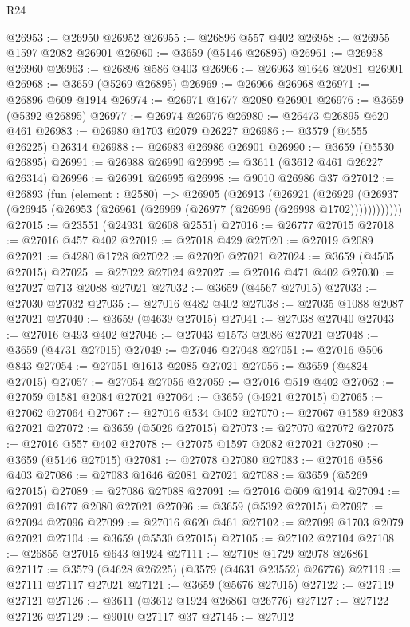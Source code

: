 \begin{lexlean}{R24}
\begin{coremodule}
@26953 := @26950 @26952
@26955 := @26896 @557 @402
@26958 := @26955 @1597 @2082 @26901
@26960 := @3659 (@5146 @26895)
@26961 := @26958 @26960
@26963 := @26896 @586 @403
@26966 := @26963 @1646 @2081 @26901
@26968 := @3659 (@5269 @26895)
@26969 := @26966 @26968
@26971 := @26896 @609 @1914
@26974 := @26971 @1677 @2080 @26901
@26976 := @3659 (@5392 @26895)
@26977 := @26974 @26976
@26980 := @26473 @26895 @620 @461
@26983 := @26980 @1703 @2079 @26227
@26986 := @3579 (@4555 @26225) @26314
@26988 := @26983 @26986 @26901
@26990 := @3659 (@5530 @26895)
@26991 := @26988 @26990
@26995 := @3611 (@3612 @461 @26227 @26314)
@26996 := @26991 @26995
@26998 := @9010 @26986 @37
@27012 := @26893
    (fun (element : @2580) =>
    @26905
      (@26913
        (@26921
          (@26929 (@26937 (@26945 (@26953 (@26961 (@26969 (@26977 (@26996 (@26998 @1702))))))))))))
@27015 := @23551 (@24931 @2608 @2551)
@27016 := @26777 @27015
@27018 := @27016 @457 @402
@27019 := @27018 @429
@27020 := @27019 @2089
@27021 := @4280 @1728
@27022 := @27020 @27021
@27024 := @3659 (@4505 @27015)
@27025 := @27022 @27024
@27027 := @27016 @471 @402
@27030 := @27027 @713 @2088 @27021
@27032 := @3659 (@4567 @27015)
@27033 := @27030 @27032
@27035 := @27016 @482 @402
@27038 := @27035 @1088 @2087 @27021
@27040 := @3659 (@4639 @27015)
@27041 := @27038 @27040
@27043 := @27016 @493 @402
@27046 := @27043 @1573 @2086 @27021
@27048 := @3659 (@4731 @27015)
@27049 := @27046 @27048
@27051 := @27016 @506 @843
@27054 := @27051 @1613 @2085 @27021
@27056 := @3659 (@4824 @27015)
@27057 := @27054 @27056
@27059 := @27016 @519 @402
@27062 := @27059 @1581 @2084 @27021
@27064 := @3659 (@4921 @27015)
@27065 := @27062 @27064
@27067 := @27016 @534 @402
@27070 := @27067 @1589 @2083 @27021
@27072 := @3659 (@5026 @27015)
@27073 := @27070 @27072
@27075 := @27016 @557 @402
@27078 := @27075 @1597 @2082 @27021
@27080 := @3659 (@5146 @27015)
@27081 := @27078 @27080
@27083 := @27016 @586 @403
@27086 := @27083 @1646 @2081 @27021
@27088 := @3659 (@5269 @27015)
@27089 := @27086 @27088
@27091 := @27016 @609 @1914
@27094 := @27091 @1677 @2080 @27021
@27096 := @3659 (@5392 @27015)
@27097 := @27094 @27096
@27099 := @27016 @620 @461
@27102 := @27099 @1703 @2079 @27021
@27104 := @3659 (@5530 @27015)
@27105 := @27102 @27104
@27108 := @26855 @27015 @643 @1924
@27111 := @27108 @1729 @2078 @26861
@27117 := @3579 (@4628 @26225) (@3579 (@4631 @23552) @26776)
@27119 := @27111 @27117 @27021
@27121 := @3659 (@5676 @27015)
@27122 := @27119 @27121
@27126 := @3611 (@3612 @1924 @26861 @26776)
@27127 := @27122 @27126
@27129 := @9010 @27117 @37
@27145 := @27012

\end{coremodule}
\end{lexlean}
